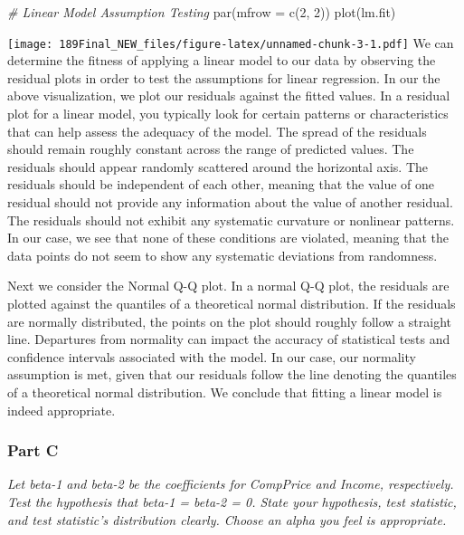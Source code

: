 \documentclass[
]{article}
\newenvironment{Shaded}{\begin{snugshade}}{\end{snugshade}}
\newcommand{\AttributeTok}[1]{\textcolor[rgb]{0.77,0.63,0.00}{#1}}
\newcommand{\CommentTok}[1]{\textcolor[rgb]{0.56,0.35,0.01}{\textit{#1}}}
\newcommand{\DecValTok}[1]{\textcolor[rgb]{0.00,0.00,0.81}{#1}}
\newcommand{\FunctionTok}[1]{\textcolor[rgb]{0.00,0.00,0.00}{#1}}
\newcommand{\NormalTok}[1]{#1}
\begin{document}
\begin{Shaded}
\begin{Highlighting}[]
\CommentTok{\# Linear Model Assumption Testing}
\FunctionTok{par}\NormalTok{(}\AttributeTok{mfrow =} \FunctionTok{c}\NormalTok{(}\DecValTok{2}\NormalTok{, }\DecValTok{2}\NormalTok{))}
\FunctionTok{plot}\NormalTok{(lm.fit)}
\end{Highlighting}
\end{Shaded}

\texttt{[image: 189Final\_NEW\_files/figure-latex/unnamed-chunk-3-1.pdf]}
We can determine the fitness of applying a linear model to our data by
observing the residual plots in order to test the assumptions for linear
regression. In our the above visualization, we plot our residuals
against the fitted values. In a residual plot for a linear model, you
typically look for certain patterns or characteristics that can help
assess the adequacy of the model. The spread of the residuals should
remain roughly constant across the range of predicted values. The
residuals should appear randomly scattered around the horizontal axis.
The residuals should be independent of each other, meaning that the
value of one residual should not provide any information about the value
of another residual. The residuals should not exhibit any systematic
curvature or nonlinear patterns. In our case, we see that none of these
conditions are violated, meaning that the data points do not seem to
show any systematic deviations from randomness.

Next we consider the Normal Q-Q plot. In a normal Q-Q plot, the
residuals are plotted against the quantiles of a theoretical normal
distribution. If the residuals are normally distributed, the points on
the plot should roughly follow a straight line. Departures from
normality can impact the accuracy of statistical tests and confidence
intervals associated with the model. In our case, our normality
assumption is met, given that our residuals follow the line denoting the
quantiles of a theoretical normal distribution. We conclude that fitting
a linear model is indeed appropriate.

\hypertarget{part-c}{%
\subsubsection{Part C}\label{part-c}}

\emph{Let beta-1 and beta-2 be the coefficients for CompPrice and
Income, respectively. Test the hypothesis that beta-1 = beta-2 = 0.
State your hypothesis, test statistic, and test statistic's distribution
clearly. Choose an alpha you feel is appropriate.}
\end{document}
